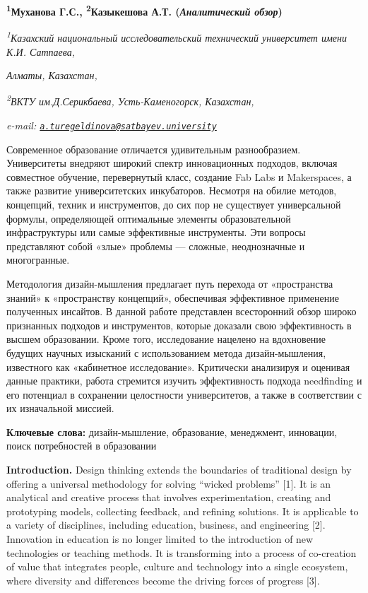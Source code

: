 {\bfseries \textsuperscript{1}Муханова Г.С., \textsuperscript{2}Казыкешова
А.Т. (\emph{Аналитический обзор})}

\emph{\textsuperscript{1}Казахский национальный исследовательский
технический университет имени К.И. Сатпаева,}

\emph{Алматы, Казахстан,}

\emph{\textsuperscript{2}ВКТУ им.Д.Серикбаева, Усть-Каменогорск,
Казахстан,}

\emph{e-mail:
\href{mailto:a.turegeldinova@satbayev.university}{\nolinkurl{a.turegeldinova@satbayev.university}}}

Современное образование отличается удивительным разнообразием.
Университеты внедряют широкий спектр инновационных подходов, включая
совместное обучение, перевернутый класс, создание Fab Labs и
Makerspaces, а также развитие университетских инкубаторов. Несмотря на
обилие методов, концепций, техник и инструментов, до сих пор не
существует универсальной формулы, определяющей оптимальные элементы
образовательной инфраструктуры или самые эффективные инструменты. Эти
вопросы представляют собой «злые» проблемы --- сложные, неоднозначные и
многогранные.

Методология дизайн-мышления предлагает путь перехода от «пространства
знаний» к «пространству концепций», обеспечивая эффективное применение
полученных инсайтов. В данной работе представлен всесторонний обзор
широко признанных подходов и инструментов, которые доказали свою
эффективность в высшем образовании. Кроме того, исследование нацелено на
вдохновение будущих научных изысканий с использованием метода
дизайн-мышления, известного как «кабинетное исследование». Критически
анализируя и оценивая данные практики, работа стремится изучить
эффективность подхода needfinding и его потенциал в сохранении
целостности университетов, а также в соответствии с их изначальной
миссией.

{\bfseries Ключевые слова:} дизайн-мышление, образование, менеджмент,
инновации, поиск потребностей в образовании

{\bfseries Introduction.} Design thinking extends the boundaries of
traditional design by offering a universal methodology for solving
``wicked problems'' {[}1{]}. It is an analytical and creative process
that involves experimentation, creating and prototyping models,
collecting feedback, and refining solutions. It is applicable to a
variety of disciplines, including education, business, and engineering
{[}2{]}. Innovation in education is no longer limited to the
introduction of new technologies or teaching methods. It is transforming
into a process of co-creation of value that integrates people, culture
and technology into a single ecosystem, where diversity and differences
become the driving forces of progress {[}3{]}.

